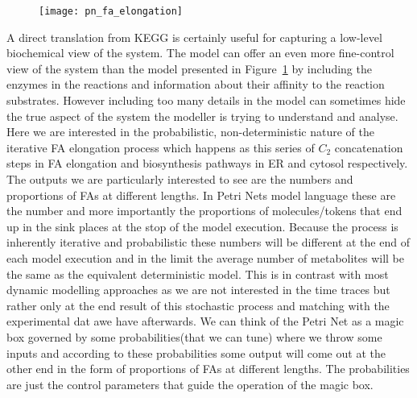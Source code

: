 \begin{figure}[htbp!]
\centering
\texttt{[image: pn\_fa\_elongation]}
\caption[FA elongation Petri Net model]{}
\label{fig:pn_fa_elongation}
\end{figure}

A direct translation from KEGG is certainly useful for capturing a
low-level biochemical view of the system. The model can offer an even
more fine-control view of the system than the model presented in
Figure~\ref{fig:pn_fa_elongation} by including the enzymes in the
reactions and information about their affinity to the reaction
substrates. However including too many details in the model can
sometimes hide the true aspect of the system the modeller is trying to
understand and analyse. Here we are interested in the probabilistic,
non-deterministic nature of the iterative FA elongation process which
happens as this series of $C_2$ concatenation steps in FA elongation
and biosynthesis pathways in ER and cytosol respectively. The outputs
we are particularly interested to see are the numbers and proportions of FAs at
different lengths. In Petri Nets model language these are the number
and more importantly the proportions
of molecules/tokens that end up in the sink places at the stop of the model
execution. Because the process is inherently iterative and
probabilistic these numbers will be different at the end of each model
execution and in the limit the average number of metabolites will be
the same as the equivalent deterministic model. This is in contrast with most dynamic modelling approaches
as we are not interested in the time traces but rather only at the end
result of this stochastic process and matching with the experimental
dat awe have afterwards. We can think of the Petri Net as a
magic box governed by some probabilities(that we can tune) where we
throw some inputs and according to these probabilities some output
will come out at the other end in the form of proportions of FAs at different
lengths. The probabilities are just the control parameters that guide
the operation of the magic box.

